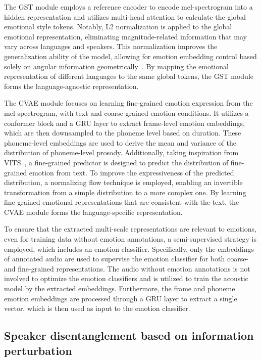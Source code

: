 \documentclass[journal,comsoc]{IEEEtran}
\begin{document}
The GST module employs a reference encoder to encode mel-spectrogram into a hidden representation and utilizes multi-head attention to calculate the global emotional style tokens. Notably, L2 normalization is applied to the global emotional representation, eliminating magnitude-related information that may vary across languages and speakers. This normalization improves the generalization ability of the model, allowing for emotion embedding control based solely on angular information geometrically~\cite{DBLP:conf/smc/KimLLJL21}. By mapping the emotional representation of different languages to the same global tokens, the GST module forms the language-agnostic representation.

The CVAE module focuses on learning fine-grained emotion expression from the mel-spectrogram, with text and coarse-grained emotion conditions. It utilizes a conformer block and a GRU layer to extract frame-level emotion embeddings, which are then downsampled to the phoneme level based on duration. These phoneme-level embeddings are used to derive the mean and variance of the distribution of phoneme-level prosody. Additionally, taking inspiration from VITS~\cite{DBLP:conf/icml/KimKS21}, a fine-grained predictor is designed to predict the distribution of fine-grained emotion from text. To improve the expressiveness of the predicted distribution, a normalizing flow technique is employed, enabling an invertible transformation from a simple distribution to a more complex one. By learning fine-grained emotional representations that are consistent with the text, the CVAE module forms the language-specific representation.

To ensure that the extracted multi-scale representations are relevant to emotions, even for training data without emotion annotations, a semi-supervised strategy is employed, which includes an emotion classifier. Specifically, only the embeddings of annotated audio are used to supervise the emotion classifier for both coarse- and fine-grained representations. The audio without emotion annotations is not involved to optimize the emotion classifiers and is utilized to train the acoustic model by the extracted embeddings. Furthermore, the frame and phoneme emotion embeddings are processed through a GRU layer to extract a single vector, which is then used as input to the emotion classifier.

\subsection{Speaker disentanglement based on information perturbation}
\end{document}

